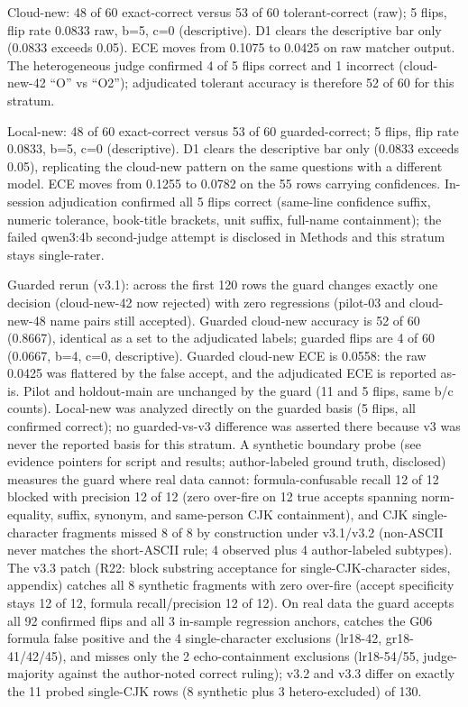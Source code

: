 \documentclass[10pt]{article} %
\begin{document}
Cloud-new: 48 of 60 exact-correct versus 53 of 60 tolerant-correct (raw); 5 flips, flip rate 0.0833 raw, b=5, c=0 (descriptive). D1 clears the descriptive bar only (0.0833 exceeds 0.05). ECE moves from 0.1075 to 0.0425 on raw matcher output. The heterogeneous judge confirmed 4 of 5 flips correct and 1 incorrect (cloud-new-42 ``O'' vs ``O2''); adjudicated tolerant accuracy is therefore 52 of 60 for this stratum.

Local-new: 48 of 60 exact-correct versus 53 of 60 guarded-correct; 5 flips, flip rate 0.0833, b=5, c=0 (descriptive). D1 clears the descriptive bar only (0.0833 exceeds 0.05), replicating the cloud-new pattern on the same questions with a different model. ECE moves from 0.1255 to 0.0782 on the 55 rows carrying confidences. In-session adjudication confirmed all 5 flips correct (same-line confidence suffix, numeric tolerance, book-title brackets, unit suffix, full-name containment); the failed qwen3:4b second-judge attempt is disclosed in Methods and this stratum stays single-rater.

Guarded rerun (v3.1): across the first 120 rows the guard changes exactly one decision (cloud-new-42 now rejected) with zero regressions (pilot-03 and cloud-new-48 name pairs still accepted). Guarded cloud-new accuracy is 52 of 60 (0.8667), identical as a set to the adjudicated labels; guarded flips are 4 of 60 (0.0667, b=4, c=0, descriptive). Guarded cloud-new ECE is 0.0558: the raw 0.0425 was flattered by the false accept, and the adjudicated ECE is reported as-is. Pilot and holdout-main are unchanged by the guard (11 and 5 flips, same b/c counts). Local-new was analyzed directly on the guarded basis (5 flips, all confirmed correct); no guarded-vs-v3 difference was asserted there because v3 was never the reported basis for this stratum. A synthetic boundary probe (see evidence pointers for script and results; author-labeled ground truth, disclosed) measures the guard where real data cannot: formula-confusable recall 12 of 12 blocked with precision 12 of 12 (zero over-fire on 12 true accepts spanning norm-equality, suffix, synonym, and same-person CJK containment), and CJK single-character fragments missed 8 of 8 by construction under v3.1/v3.2 (non-ASCII never matches the short-ASCII rule; 4 observed plus 4 author-labeled subtypes). The v3.3 patch (R22: block substring acceptance for single-CJK-character sides, appendix) catches all 8 synthetic fragments with zero over-fire (accept specificity stays 12 of 12, formula recall/precision 12 of 12). On real data the guard accepts all 92 confirmed flips and all 3 in-sample regression anchors, catches the G06 formula false positive and the 4 single-character exclusions (lr18-42, gr18-41/42/45), and misses only the 2 echo-containment exclusions (lr18-54/55, judge-majority against the author-noted correct ruling); v3.2 and v3.3 differ on exactly the 11 probed single-CJK rows (8 synthetic plus 3 hetero-excluded) of 130.
\end{document}
